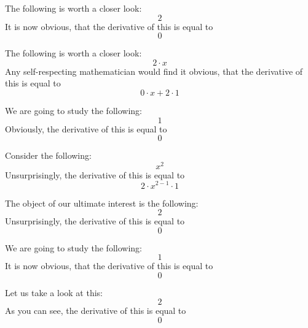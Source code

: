 \documentclass{article}
\begin{document}
The following is worth a closer look:
\begin{equation}
2 
\end{equation}
It is now obvious, that the derivative of this is equal to
\begin{equation}
0 
\end{equation}

The following is worth a closer look:
\begin{equation}
2 \cdot x 
\end{equation}
Any self-respecting mathematician would find it obvious, that the derivative of this is equal to
\begin{equation}
0 \cdot x + 2 \cdot 1 
\end{equation}

We are going to study the following:
\begin{equation}
1 
\end{equation}
Obviously, the derivative of this is equal to
\begin{equation}
0 
\end{equation}

Consider the following:
\begin{equation}
x ^{2 } 
\end{equation}
Unsurprisingly, the derivative of this is equal to
\begin{equation}
2 \cdot x ^{2 - 1 } \cdot 1 
\end{equation}

The object of our ultimate interest is the following:
\begin{equation}
2 
\end{equation}
Unsurprisingly, the derivative of this is equal to
\begin{equation}
0 
\end{equation}

We are going to study the following:
\begin{equation}
1 
\end{equation}
It is now obvious, that the derivative of this is equal to
\begin{equation}
0 
\end{equation}

Let us take a look at this:
\begin{equation}
2 
\end{equation}
As you can see, the derivative of this is equal to
\begin{equation}
0 
\end{equation}
\end{document}
